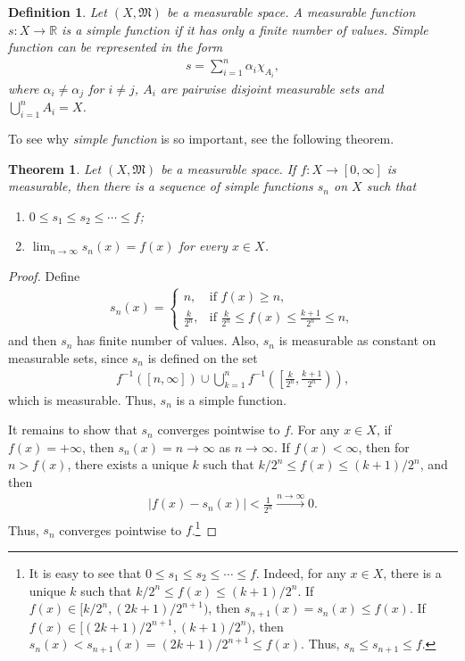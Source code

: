 \documentclass[11pt]{book}
\newtheorem{definition}{Definition}[chapter]
\newtheorem{theorem}{Theorem}[chapter]
\theoremstyle{definition}
\numberwithin{equation}{chapter}
\begin{document}
\begin{definition}
Let $(X,\mathfrak{M})$ be a measurable space. A measurable function $s: X \to \mathbb{R}$ is a simple function if it has only a finite number of values. Simple function can be represented in the form
\begin{align*}
    s = \sum^n_{i=1} \alpha_i \chi_{A_i},
\end{align*}
where $\alpha_i \neq \alpha_j$ for $i \neq j$, $A_i$ are pairwise disjoint measurable sets and $\bigcup^n_{i=1} A_i = X$.
\end{definition}

\medskip

To see why {\em simple function} is so important, see the following theorem.

\medskip

\begin{theorem}\label{theorem_27}
Let $(X,\mathfrak{M})$ be a measurable space. If $f: X \to [0,\infty]$ is measurable, then there is a sequence of simple functions $s_n$ on $X$ such that 
\begin{enumerate}[label=(\alph*)]
    \item $0 \leq s_1 \leq s_2 \leq \cdots \leq f$;
    
    \item $\lim_{n\to\infty} s_n(x) = f(x)$ for every $x \in X$.
\end{enumerate}
\end{theorem}
\begin{proof}
Define
\begin{align*}
    s_n(x) = \begin{cases}
        n, & \text{if}\,\, f(x) \geq n, \\
        \frac{k}{2^n}, & \text{if}\,\, \frac{k}{2^n} \leq f(x) \leq \frac{k+1}{2^n} \leq n,
    \end{cases}
\end{align*}
and then $s_n$ has finite number of values. Also, $s_n$ is measurable as constant on measurable sets, since $s_n$ is defined on the set
\begin{align*}
    f^{-1}([n,\infty]) \cup \bigcup^n_{k=1} f^{-1}\left(\left[\frac{k}{2^n},\frac{k+1}{2^n}\right)\right),
\end{align*}
which is measurable. Thus, $s_n$ is a simple function.

It remains to show that $s_n$ converges pointwise to $f$. For any $x \in X$, if $f(x) = +\infty$, then $s_n(x) = n \to \infty$ as $n \to \infty$. If $f(x) < \infty$, then for $n > f(x)$, there exists a unique $k$ such that $k/2^n \leq f(x) \leq (k+1)/2^n$, and then
\begin{align*}
    \left|f(x) - s_n(x)\right| < \frac{1}{2^n} \xrightarrow[]{n\to\infty} 0.
\end{align*}
Thus, $s_n$ converges pointwise to $f$.\footnote{It is easy to see that $0 \leq s_1 \leq s_2 \leq \cdots \leq f$. Indeed, for any $x \in X$, there is a unique $k$ such that $k/2^n \leq f(x) \leq (k+1)/2^n$. If $f(x)\in [k/2^n,(2k+1)/2^{n+1})$, then $s_{n+1}(x) = s_n(x) \leq f(x)$. If $f(x)\in [(2k+1)/2^{n+1},(k+1)/2^n)$, then $s_n(x) < s_{n+1}(x) = (2k+1)/2^{n+1} \leq f(x)$. Thus, $s_n \leq s_{n+1} \leq f$.}
\end{proof}
\end{document}
